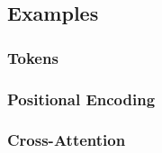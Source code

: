 \subsection{Examples}
\subsubsection{Tokens}
\begin{example}
\end{example}

\subsubsection{Positional Encoding}
\begin{example}
\end{example}

\subsubsection{Cross-Attention}
\begin{example}
\end{example}
